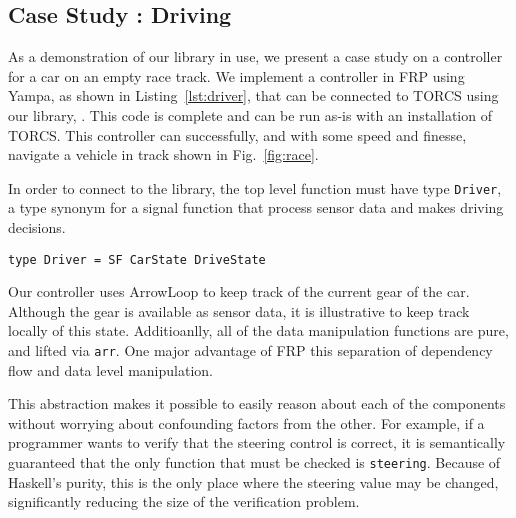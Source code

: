 \subsection{Case Study : Driving}

As a demonstration of our library in use, we present a case study on a controller for a car on an empty race track.
We implement a controller in FRP using Yampa, as shown in Listing~\ref{lst:driver}, that can be connected to TORCS using our library, \ourLib.
This code is complete and can be run as-is with an installation of TORCS.
This controller can successfully, and with some speed and finesse, navigate a vehicle in track shown in Fig.~\ref{fig:race}.

In order to connect to the library, the top level function must have type \texttt{Driver}, a type synonym for a signal function that process sensor data and makes driving decisions.

\begin{lstlisting}
type Driver = SF CarState DriveState
\end{lstlisting}

Our controller uses ArrowLoop to keep track of the current gear of the car.
Although the gear is available as sensor data, it is illustrative to keep track locally of this state.
Additioanlly, all of the data manipulation functions are pure, and lifted via \texttt{arr}.
One major advantage of FRP this separation of dependency flow and data level manipulation. 

This abstraction makes it possible to easily reason about each of the components without worrying about confounding factors from the other.
For example, if a programmer wants to verify that the steering control is correct, it is semantically guaranteed that the only function that must be checked is \texttt{steering}.
Because of Haskell's purity, this is the only place where the steering value may be changed, significantly reducing the size of the verification problem.

